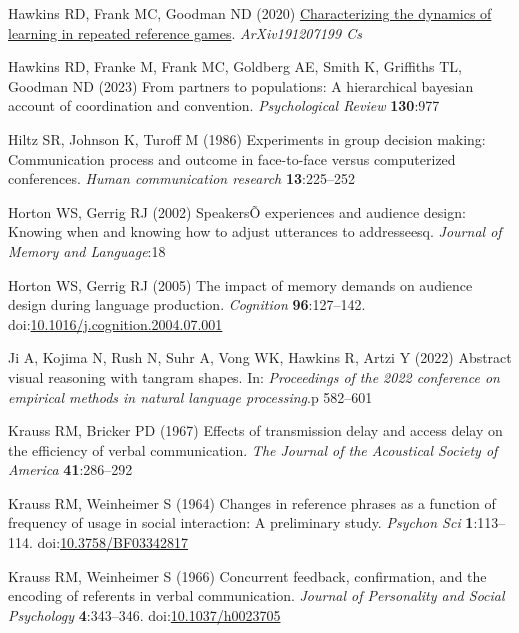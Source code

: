 \documentclass[
  english,
]{article}
\newlength{\cslhangindent}
\newlength{\cslentryspacingunit} %
\newenvironment{CSLReferences}[2] %
 {%
  \setlength{\parindent}{0pt}
  \ifodd #1
  \let\oldpar\par
  \def\par{\hangindent=\cslhangindent\oldpar}
  \fi
  \setlength{\parskip}{#2\cslentryspacingunit}
 }%
 {}
\begin{document}
\begin{CSLReferences}{1}{0}
\leavevmode{}%
Hawkins RD, Frank MC, Goodman ND (2020) \href{http://arxiv.org/abs/1912.07199}{Characterizing the dynamics of learning in repeated reference games}. \emph{ArXiv191207199 Cs}

\leavevmode{}%
Hawkins RD, Franke M, Frank MC, Goldberg AE, Smith K, Griffiths TL, Goodman ND (2023) From partners to populations: A hierarchical bayesian account of coordination and convention. \emph{Psychological Review} \textbf{130}:977

\leavevmode{}%
Hiltz SR, Johnson K, Turoff M (1986) Experiments in group decision making: Communication process and outcome in face-to-face versus computerized conferences. \emph{Human communication research} \textbf{13}:225--252

\leavevmode{}%
Horton WS, Gerrig RJ (2002) {SpeakersÕ} experiences and audience design: Knowing when and knowing how to adjust utterances to addresseesq. \emph{Journal of Memory and Language}:18

\leavevmode{}%
Horton WS, Gerrig RJ (2005) The impact of memory demands on audience design during language production. \emph{Cognition} \textbf{96}:127--142. doi:\href{https://doi.org/10.1016/j.cognition.2004.07.001}{10.1016/j.cognition.2004.07.001}

\leavevmode{}%
Ji A, Kojima N, Rush N, Suhr A, Vong WK, Hawkins R, Artzi Y (2022) Abstract visual reasoning with tangram shapes. In: \emph{Proceedings of the 2022 conference on empirical methods in natural language processing}.p 582--601

\leavevmode{}%
Krauss RM, Bricker PD (1967) Effects of transmission delay and access delay on the efficiency of verbal communication. \emph{The Journal of the Acoustical Society of America} \textbf{41}:286--292

\leavevmode{}%
Krauss RM, Weinheimer S (1964) Changes in reference phrases as a function of frequency of usage in social interaction: A preliminary study. \emph{Psychon Sci} \textbf{1}:113--114. doi:\href{https://doi.org/10.3758/BF03342817}{10.3758/BF03342817}

\leavevmode{}%
Krauss RM, Weinheimer S (1966) Concurrent feedback, confirmation, and the encoding of referents in verbal communication. \emph{Journal of Personality and Social Psychology} \textbf{4}:343--346. doi:\href{https://doi.org/10.1037/h0023705}{10.1037/h0023705}


\end{CSLReferences}
\end{document}
